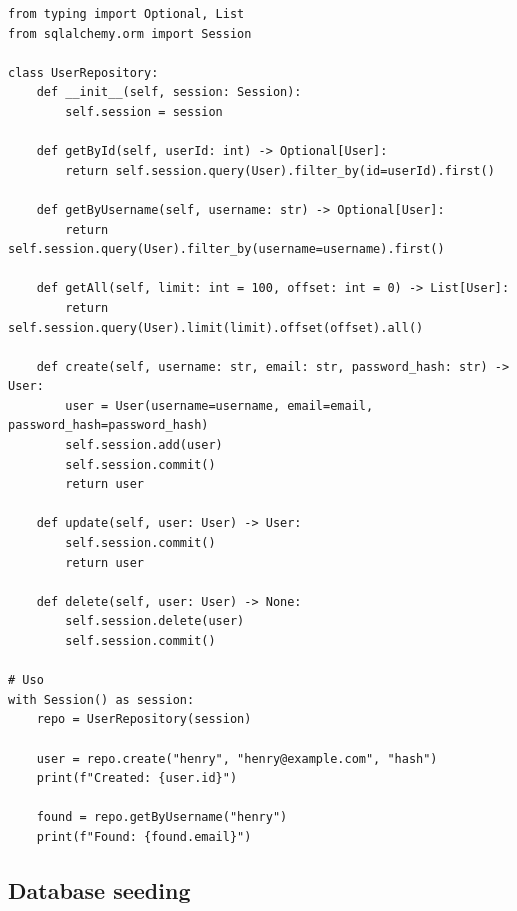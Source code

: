 \begin{lstlisting}
from typing import Optional, List
from sqlalchemy.orm import Session

class UserRepository:
    def __init__(self, session: Session):
        self.session = session

    def getById(self, userId: int) -> Optional[User]:
        return self.session.query(User).filter_by(id=userId).first()

    def getByUsername(self, username: str) -> Optional[User]:
        return self.session.query(User).filter_by(username=username).first()

    def getAll(self, limit: int = 100, offset: int = 0) -> List[User]:
        return self.session.query(User).limit(limit).offset(offset).all()

    def create(self, username: str, email: str, password_hash: str) -> User:
        user = User(username=username, email=email, password_hash=password_hash)
        self.session.add(user)
        self.session.commit()
        return user

    def update(self, user: User) -> User:
        self.session.commit()
        return user

    def delete(self, user: User) -> None:
        self.session.delete(user)
        self.session.commit()

# Uso
with Session() as session:
    repo = UserRepository(session)

    user = repo.create("henry", "henry@example.com", "hash")
    print(f"Created: {user.id}")

    found = repo.getByUsername("henry")
    print(f"Found: {found.email}")
\end{lstlisting}

\subsection{Database seeding}

